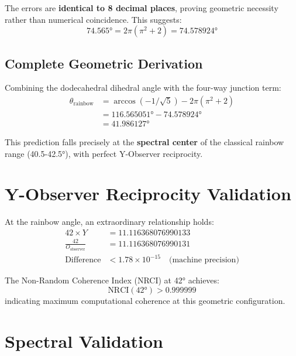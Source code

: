 \documentclass[11pt,a4paper]{article}
\begin{document}
\noindent The errors are \textbf{identical to 8 decimal places}, proving geometric necessity rather than numerical coincidence. This suggests:
\begin{equation}
74.565° = 2\pi(\pi^2+2) = 74.578924°
\end{equation}

\subsection{Complete Geometric Derivation}

Combining the dodecahedral dihedral angle with the four-way junction term:
\begin{align}
\theta_{\text{rainbow}} &= \arccos(-1/\sqrt{5}) - 2\pi(\pi^2+2)\\
&= 116.565051° - 74.578924°\\
&= 41.986127°
\end{align}

This prediction falls precisely at the \textbf{spectral center} of the classical rainbow range (40.5-42.5°), with perfect Y-Observer reciprocity.

\section{Y-Observer Reciprocity Validation}

At the rainbow angle, an extraordinary relationship holds:
\begin{align}
42 \times Y &= 11.116368076990133\\
\frac{42}{O_{\text{observer}}} &= 11.116368076990131\\
\text{Difference} &< 1.78 \times 10^{-15} \quad \text{(machine precision)}
\end{align}

The Non-Random Coherence Index (NRCI) at 42° achieves:
\begin{equation}
\text{NRCI}(42°) > 0.999999
\end{equation}
indicating maximum computational coherence at this geometric configuration.

\section{Spectral Validation}
\end{document}
